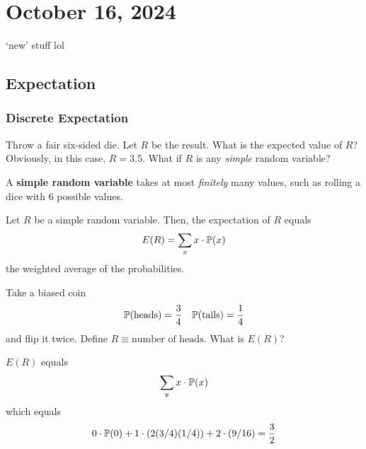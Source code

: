 \section{October 16, 2024}
`new' stuff lol

\subsection{Expectation}

\subsubsection{Discrete Expectation}

Throw a fair six-sided die. Let $R$ be the result. What is the expected value of $R$? Obviously, in this case, $R = 3.5$. What if $R$ is any \textit{simple} random variable?

\begin{definition}
    A \textbf{simple random variable} takes at most \textit{finitely} many values, such as rolling a dice with $6$ possible values.
\end{definition}

\begin{definition}
    Let $R$ be a simple random variable. Then, the expectation of $R$ equals
    \begin{align}
        E(R) = \sum_x x \cdot \mathbb{P}(x)
    \end{align}
    the weighted average of the probabilities.
\end{definition}

\begin{example}
    Take a biased coin
    \begin{align}
        \mathbb{P}(\text{heads}) = \frac{3}{4} && \mathbb{P}(\text{tails}) = \frac{1}{4}
    \end{align}
    and flip it twice. Define $R \equiv \text{number of heads}$. What is $E(R)$?
\end{example}
\begin{solution}
    $E(R)$ equals
    \begin{align}
        \sum_x x \cdot \mathbb{P}(x)
    \end{align}
    which equals
    \begin{align}
        0 \cdot \mathbb{P}(0) + 1 \cdot (2(3/4)(1/4)) + 2 \cdot (9/16) = \frac{3}{2}
    \end{align}
\end{solution}

